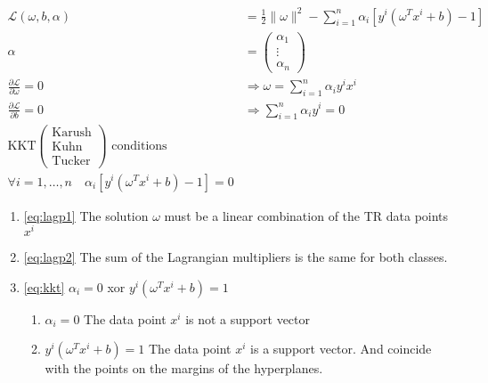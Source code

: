 \begin{align*}
	\mathscr{L}(\omega, b, \alpha)                   & = \frac{1}{2}\lVert\omega\rVert^2 - \sum_{i=1}^n \alpha_i \left[ y^i(\omega^Tx^i + b) - 1 \right] \\
	\alpha                                           & = \begin{pmatrix} \alpha_1 \\ \vdots \\ \alpha_n \end{pmatrix}
	\tag{Lagrangian multiplier}                                                                                                                          \\
	\frac{\partial \mathscr{L}}{\partial \omega} = 0 & \Rightarrow \omega = \sum_{i=1}^n \alpha_i y^i x^i \tag{p1}\label{eq:lagp1}                       \\
	\frac{\partial \mathscr{L}}{\partial b} = 0      & \Rightarrow \sum_{i=1}^n \alpha_i y^i = 0 \tag{p2}\label{eq:lagp2}                                \\
	\text{KKT} \begin{pmatrix}
		           \text{Karush} \\
		           \text{Kuhn}   \\
		           \text{Tucker}
	           \end{pmatrix} \text{ conditions}                                                                                                          \\
	\forall i=1,\dots,n \quad \alpha_i \left[ y^i(\omega^Tx^i + b) - 1 \right] = 0 \tag{kkt}\label{eq:kkt}
\end{align*}

\begin{enumerate}
	\item \ref{eq:lagp1} \textrightarrow{} The solution $\omega$ must be a linear combination of the TR data points $x^i$
	\item \ref{eq:lagp2} \textrightarrow{} The sum of the Lagrangian multipliers is the same for both classes.
	\item \ref{eq:kkt} \textrightarrow{} $\alpha_i = 0$  xor $y^i(\omega^Tx^i + b) = 1$
	      \begin{enumerate}
		      \item $\alpha_i = 0$ \textrightarrow{} The data point $x^i$ is not a support vector
		      \item $y^i(\omega^Tx^i + b) = 1$ \textrightarrow{} The data point $x^i$ is a support vector. And coincide with the points on the margins of the hyperplanes.
	      \end{enumerate}
\end{enumerate}

